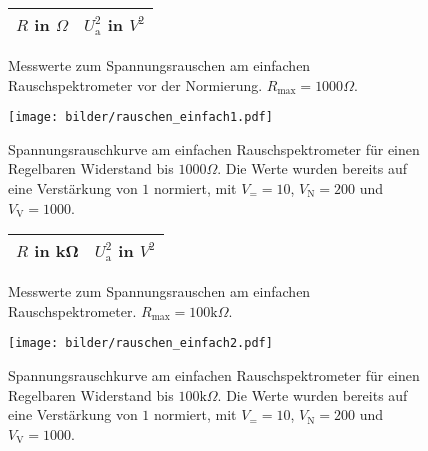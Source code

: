 	\begin{figure}[htbp]

	\begin{minipage}{0.3\textwidth}

			\centering
			\begin{tabular}{cc}
				\toprule \midrule
				$R$ in $\Omega$ & $U_\text{a}^2$ in $V^2$ \\
				\midrule
				
				\midrule \bottomrule
			\end{tabular}
			\caption{Messwerte zum Spannungsrauschen am einfachen
			Rauschspektrometer vor der Normierung. $R_\text{max}=1000 \Omega$.}
			\label{tab:rauschen_einfach1}

	\end{minipage}
	\hfill
	\begin{minipage}{0.7\textwidth}

			\centering
			\texttt{[image: bilder/rauschen\_einfach1.pdf]}
			\caption{Spannungsrauschkurve am einfachen Rauschspektrometer für einen
			Regelbaren Widerstand bis $1000\Omega$. Die Werte wurden bereits auf
			eine Verstärkung von
			$1$ normiert, mit $V_= =10$, $V_\text{N}=200$ und $V_\text{V}=1000$. }
			\label{fig:rauschen_einfach1}

	\end{minipage}
	\end{figure}




		\begin{figure}[htbp]

	\begin{minipage}{0.3\textwidth}

			\centering
			\begin{tabular}{cc}
				\toprule \midrule
				$R$ in \si{\kilo\ohm} & $U_\text{a}^2$ in $V^2$ \\
				\midrule
				
				\midrule \bottomrule
			\end{tabular}
			\caption{Messwerte zum Spannungsrauschen am einfachen
			Rauschspektrometer. $R_\text{max}=100 \text{k}\Omega$.}
			\label{tab:rauschen_einfach2}

	\end{minipage}
	\hfill
	\begin{minipage}{0.7\textwidth}

			\centering
			\texttt{[image: bilder/rauschen\_einfach2.pdf]}
			\caption{Spannungsrauschkurve am einfachen Rauschspektrometer für einen
			Regelbaren Widerstand bis $100\text{k}\Omega$. Die Werte wurden bereits auf eine
			Verstärkung von 	$1$ normiert, mit $V_= =10$, $V_\text{N}=200$ und $V_\text{V}=1000$. }
			\label{fig:rauschen_einfach2}

	\end{minipage}

	\end{figure}


